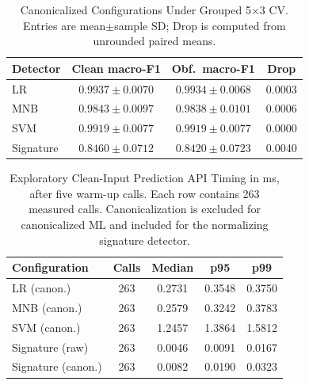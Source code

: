 \begin{table}[htbp]
\caption{Canonicalized Configurations Under Grouped 5$\times$3 CV.
  Entries are mean$\pm$sample SD; Drop is computed from unrounded paired means.}
\label{tab:cv}
\begin{center}
\setlength{\tabcolsep}{4pt}\footnotesize
\begin{tabular}{|l|c|c|c|}
\hline
\textbf{Detector}&\textbf{Clean macro-F1}&\textbf{Obf.\ macro-F1}&\textbf{Drop}\\
\hline
LR        & $0.9937\pm0.0070$ & $0.9934\pm0.0068$ & 0.0003 \\
\hline
MNB       & $0.9843\pm0.0097$ & $0.9838\pm0.0101$ & 0.0006 \\
\hline
SVM       & $0.9919\pm0.0077$ & $0.9919\pm0.0077$ & 0.0000 \\
\hline
Signature & $0.8460\pm0.0712$ & $0.8420\pm0.0723$ & 0.0040 \\
\hline
\end{tabular}
\end{center}
\end{table}

\begin{table}[htbp]
\caption{Exploratory Clean-Input Prediction API Timing in ms, after
five warm-up calls. Each row contains 263 measured calls.
Canonicalization is excluded for canonicalized ML and included for
the normalizing signature detector.}
\label{tab:timing}
\begin{center}
\setlength{\tabcolsep}{4pt}\footnotesize
\begin{tabular}{|l|c|c|c|c|}
\hline
\textbf{Configuration}&\textbf{Calls}&\textbf{Median}&\textbf{p95}&\textbf{p99}\\
\hline
LR (canon.)        & 263 & 0.2731 & 0.3548 & 0.3750 \\
\hline
MNB (canon.)       & 263 & 0.2579 & 0.3242 & 0.3783 \\
\hline
SVM (canon.)       & 263 & 1.2457 & 1.3864 & 1.5812 \\
\hline
Signature (raw)    & 263 & 0.0046 & 0.0091 & 0.0167 \\
\hline
Signature (canon.) & 263 & 0.0082 & 0.0190 & 0.0323 \\
\hline
\end{tabular}
\end{center}
\end{table}
